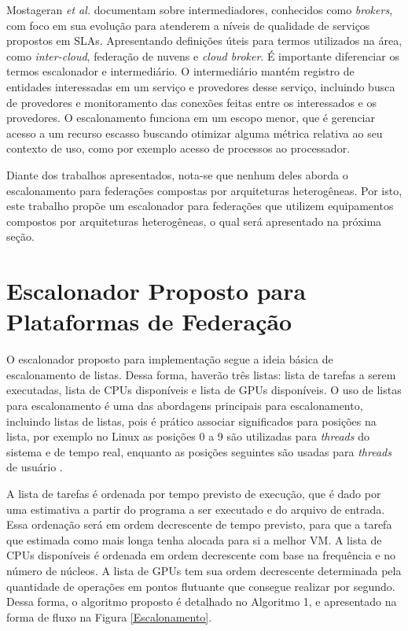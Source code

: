 Mostageran \textit{et al.} \cite{7224588} documentam sobre intermediadores, conhecidos como \textit{brokers}, com foco em sua evolução para atenderem a níveis de qualidade de serviços propostos em \acrshort{SLA}s. Apresentando definições úteis para termos utilizados na área, como \textit{inter-cloud}, federação de nuvens e \textit{cloud broker}. É importante diferenciar os termos escalonador e intermediário. O intermediário mantém registro de entidades interessadas em um serviço e provedores desse serviço, incluindo busca de provedores e monitoramento das conexões feitas entre os interessados e os provedores. O escalonamento funciona em um escopo menor, que é gerenciar acesso a um recurso escasso buscando otimizar alguma métrica relativa ao seu contexto de uso, como por exemplo acesso de processos ao processador.

Diante dos trabalhos apresentados, nota-se que nenhum deles aborda o escalonamento para federações compostas por arquiteturas heterogêneas. Por isto, este trabalho propõe um escalonador para federações que utilizem equipamentos compostos por arquiteturas heterogêneas, o qual será apresentado na próxima seção.

\section{Escalonador Proposto para Plataformas de Federação}

O escalonador proposto para implementação segue a ideia básica de escalonamento de listas. Dessa forma, haverão três listas: lista de tarefas a serem executadas, lista de \acrshort{CPU}s disponíveis e lista de \acrshort{GPU}s disponíveis. O uso de listas para escalonamento é uma das abordagens principais para escalonamento, incluindo listas de listas\cite{MultilevelFQ}, pois é prático associar significados para posições na lista, por exemplo no Linux as posições 0 a 9 são utilizadas para \textit{threads} do sistema e de tempo real, enquanto as posições seguintes são usadas para \textit{threads} de usuário \cite{KernelsComp}.

A lista de tarefas é ordenada por tempo previsto de execução, que é dado por uma estimativa a partir do programa a ser executado e do arquivo de entrada. Essa ordenação será em ordem decrescente de tempo previsto, para que a tarefa que estimada como mais longa tenha alocada para si a melhor \acrshort{VM}. A lista de \acrshort{CPU}s disponíveis é ordenada em ordem decrescente com base na frequência e no número de núcleos. A lista de \acrshort{GPU}s tem sua ordem decrescente determinada pela quantidade de operações em pontos flutuante que consegue realizar por segundo. Dessa forma, o algoritmo proposto é detalhado no Algoritmo 1, e apresentado na forma de fluxo na Figura \ref{Escalonamento}.

